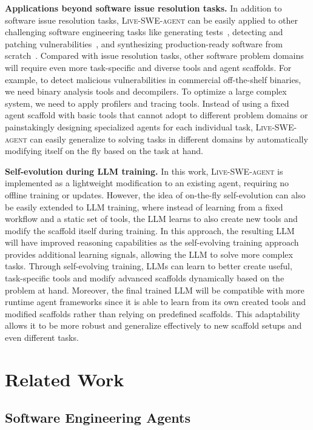 \documentclass{article}
\newcommand{\tech}{\textsc{Live-SWE-agent}\xspace}
\renewcommand{\cite}{\citep}
\newcommand{\llm}{LLM\xspace}
\newcommand{\parabf}[1]{\vspace{.03in}\noindent \textbf{#1}}
\begin{document}
\parabf{Applications beyond software issue resolution tasks.}
In addition to software issue resolution tasks, \tech can be easily applied to other challenging software engineering tasks like generating tests~\cite{deng2023large}, detecting and patching vulnerabilities~\cite{lee2025sec}, and synthesizing production-ready software from scratch~\cite{zhao2024commit0}.
Compared with issue resolution tasks, other software problem domains will require even more task-specific and diverse tools and agent scaffolds.
For example, to detect malicious vulnerabilities in commercial off-the-shelf binaries, we need binary analysis tools and decompilers. 
To optimize a large complex system, we need to apply profilers and tracing tools.
Instead of using a fixed agent scaffold with basic tools that cannot adopt to different problem domains or painstakingly designing specialized agents for each individual task, \tech can easily generalize to solving tasks in different domains by automatically modifying itself on the fly based on the task at hand.

\parabf{Self-evolution during \llm training.}
In this work, \tech is implemented as a lightweight modification to an existing agent, requiring no offline training or updates.
However, the idea of on-the-fly self-evolution can also be easily extended to \llm training, where instead of learning from a fixed workflow and a static set of tools, the \llm learns to also create new tools and modify the scaffold itself during training. 
In this approach, the resulting \llm will have improved reasoning capabilities as the self-evolving training approach provides additional learning signals, allowing the \llm to solve more complex tasks. 
Through self-evolving training, \llm{s} can learn to better create useful, task-specific tools and modify advanced scaffolds dynamically based on the problem at hand. 
Moreover, the final trained \llm will be compatible with more runtime agent frameworks since it is able to learn from its own created tools and modified scaffolds rather than relying on predefined scaffolds. 
This adaptability allows it to be more robust and generalize effectively to new scaffold setups and
even different tasks.





\section{Related Work}
\subsection{Software Engineering Agents}
\end{document}
